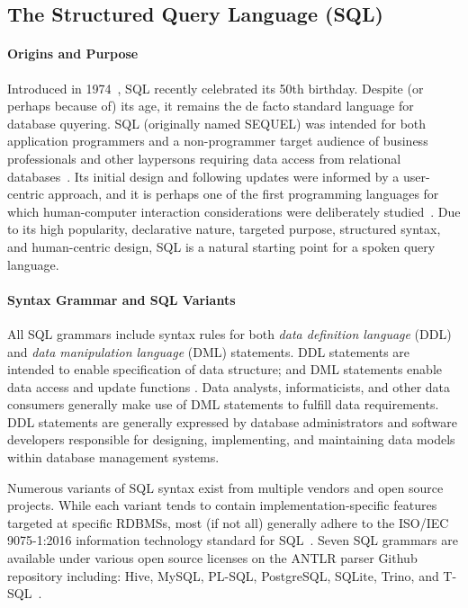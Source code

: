 \subsection{The Structured Query Language (SQL)}

\paragraph{\textbf{Origins and Purpose}}

Introduced in 1974~\cite{Chamberlin1974}, SQL recently celebrated its 50th birthday. Despite (or perhaps because of) its age, it remains the de facto standard language for database quyering. SQL (originally named SEQUEL) was intended for both application programmers and a non-programmer target audience of business professionals and other laypersons requiring data access from relational databases~\cite{Chamberlin1976}. Its initial design and following updates were informed by a user-centric approach, and it is perhaps one of the first programming languages for which human-computer interaction considerations were deliberately studied~\cite{Reisner1975,Reisner1977}. Due to its high popularity, declarative nature, targeted purpose, structured syntax, and human-centric design, SQL is a natural starting point for a spoken query language.

\paragraph{\textbf{Syntax Grammar and SQL Variants}}

All SQL grammars include syntax rules for both \emph{data definition language} (DDL) and \emph{data manipulation language} (DML) statements. DDL statements are intended to enable specification of data structure; and DML statements enable data access and update functions \cite{DBLP:books/aw/AbiteboulHV95}. Data analysts, informaticists, and other data consumers generally make use of DML statements to fulfill data requirements. DDL statements are generally expressed by database administrators and software developers responsible for designing, implementing, and maintaining data models within database management systems. 

Numerous variants of SQL syntax exist from multiple vendors and open source projects. While each variant tends to contain implementation-specific features targeted at specific RDBMSs, most (if not all) generally adhere to the ISO/IEC 9075-1:2016 information technology standard for SQL~\cite{kelechava_2020}. Seven SQL grammars are available under various open source licenses on the ANTLR parser Github repository including: Hive, MySQL, PL-SQL, PostgreSQL, SQLite, Trino, and T-SQL~\cite{antlrgrammarsv4}.


